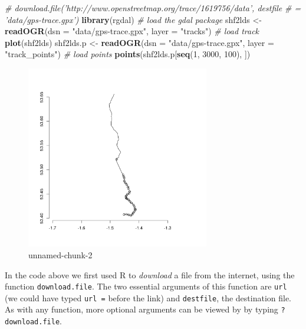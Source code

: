 \documentclass[]{article}
\newenvironment{Shaded}{}{}
\newcommand{\KeywordTok}[1]{\textcolor[rgb]{0.00,0.44,0.13}{\textbf{{#1}}}}
\newcommand{\DataTypeTok}[1]{\textcolor[rgb]{0.56,0.13,0.00}{{#1}}}
\newcommand{\DecValTok}[1]{\textcolor[rgb]{0.25,0.63,0.44}{{#1}}}
\newcommand{\StringTok}[1]{\textcolor[rgb]{0.25,0.44,0.63}{{#1}}}
\newcommand{\CommentTok}[1]{\textcolor[rgb]{0.38,0.63,0.69}{\textit{{#1}}}}
\newcommand{\NormalTok}[1]{{#1}}
\let\Oldincludegraphics\includegraphics
\renewcommand{\includegraphics}[1]{\Oldincludegraphics[width=8cm]{#1}}
\begin{document}
\begin{Shaded}
\begin{Highlighting}[]
\CommentTok{# download.file('http://www.openstreetmap.org/trace/1619756/data', destfile}
\CommentTok{# = 'data/gps-trace.gpx')}
\KeywordTok{library}\NormalTok{(rgdal)  }\CommentTok{# load the gdal package}
\NormalTok{shf2lds <- }\KeywordTok{readOGR}\NormalTok{(}\DataTypeTok{dsn =} \StringTok{"data/gps-trace.gpx"}\NormalTok{, }\DataTypeTok{layer =} \StringTok{"tracks"}\NormalTok{)  }\CommentTok{# load track}
\KeywordTok{plot}\NormalTok{(shf2lds)}
\NormalTok{shf2lds.p <- }\KeywordTok{readOGR}\NormalTok{(}\DataTypeTok{dsn =} \StringTok{"data/gps-trace.gpx"}\NormalTok{, }\DataTypeTok{layer =} \StringTok{"track_points"}\NormalTok{)  }\CommentTok{# load points}
\KeywordTok{points}\NormalTok{(shf2lds.p[}\KeywordTok{seq}\NormalTok{(}\DecValTok{1}\NormalTok{, }\DecValTok{3000}\NormalTok{, }\DecValTok{100}\NormalTok{), ])}
\end{Highlighting}
\end{Shaded}
\begin{figure}[htbp]
\centering
\includegraphics{figure/unnamed-chunk-2.png}
\caption{unnamed-chunk-2}
\end{figure}

In the code above we first used R to \emph{download} a file from the
internet, using the function \texttt{download.file}. The two essential
arguments of this function are \texttt{url} (we could have typed
\texttt{url =} before the link) and \texttt{destfile}, the destination
file. As with any function, more optional arguments can be viewed by by
typing \texttt{?download.file}.
\end{document}
